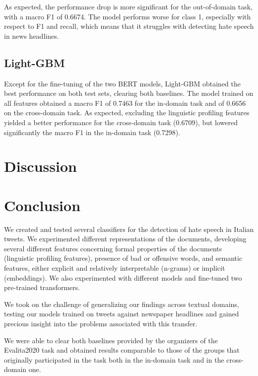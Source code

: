 \documentclass[a4paper, 9pt, twocolumn, DIV=calc]{scrartcl}
\begin{document}
As expected, the performance drop is more significant for the out-of-domain task, with a macro F1 of 0.6674. The model performs worse for class 1, especially with respect to F1 and recall, which means that it struggles with detecting hate speech in news headlines.


\subsection{Light-GBM}
Except for the fine-tuning of the two BERT models, Light-GBM obtained the best performance on both test sets, clearing both baselines.
The model trained on all features obtained a macro F1 of 0.7463 for the in-domain task and of 0.6656 on the cross-domain task.
As expected, excluding the linguistic profiling features yielded a better performance for the cross-domain task (0.6709), but lowered significantly the macro F1 in the in-domain task (0.7298).



\section{Discussion}


\section{Conclusion}
We created and tested several classifiers for the detection of hate speech in Italian tweets.
We experimented different representations of the documents, developing several different features concerning formal properties of the documents (linguistic profiling features), presence of bad or offensive words, and semantic features, either explicit and relatively interpretable (n-grams) or implicit (embeddings).
We also experimented with different models and fine-tuned two pre-trained transformers.

We took on the challenge of generalizing our findings across textual domains, testing our models trained on tweets against newspaper headlines and gained precious insight into the problems associated with this transfer.

We were able to clear both baselines provided by the organizers of the Evalita2020 task and obtained results comparable to those of the groups that originally participated in the task both in the in-domain task and in the cross-domain one.

\printbibliography{}
\end{document}
